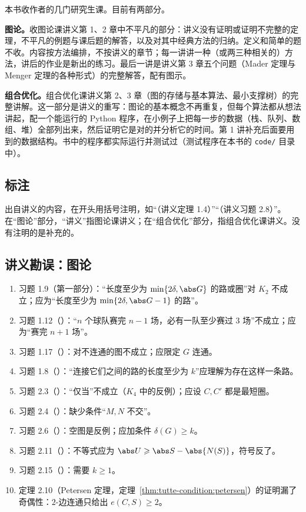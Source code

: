 
本书收作者的几门研究生课。目前有两部分。

\textbf{图论。}收图论课讲义第 1、2 章中不平凡的部分：讲义没有证明或证明不完整的定理，不平凡的例题与课后题的解答，以及对其中经典方法的归纳。定义和简单的题不收。内容按方法编排，不按讲义的章节；每一讲讲一种（或两三种相关的）方法，讲后的作业是新出的练习。最后一讲是讲义第 3 章五个问题（Mader 定理与 Menger 定理的各种形式）的完整解答，配有图示。

\textbf{组合优化。}组合优化课讲义第 2、3 章（图的存储与基本算法、最小支撑树）的完整讲解。这一部分是讲义的重写：图论的基本概念不再重复，但每个算法都从想法讲起，配一个能运行的 Python 程序，在小例子上把每一步的数据（栈、队列、数组、堆）全部列出来，然后证明它是对的并分析它的时间。第 1 讲补充后面要用到的数据结构。书中的程序都实际运行并测试过（测试程序在本书的 \texttt{code/} 目录中）。

\subsection*{标注}

出自讲义的内容，在开头用括号注明，如“（讲义定理 1.4）”“（讲义习题 2.8）”。在“图论”部分，“讲义”指图论课讲义；在“组合优化”部分，指组合优化课讲义。没有注明的是补充的。

\subsection*{讲义勘误：图论}

\begin{enumerate}
\item 习题 1.9（第一部分）：“长度至少为 $\min\{2\delta,\abs G\}$ 的路或圈”对 $K_2$ 不成立；应为“长度至少为 $\min\{2\delta,\abs G-1\}$ 的路”。
\item 习题 1.12（）：“$n$ 个球队赛完 $n-1$ 场，必有一队至少赛过 $3$ 场”不成立；应为“赛完 $n+1$ 场”。
\item 习题 1.17（）：对不连通的图不成立；应限定 $G$ 连通。
\item 习题 1.8（）：“连接它们之间的路的长度至少为 $k$”应理解为存在这样一条路。
\item 习题 2.3（）：“仅当”不成立（$K_4$ 中的反例）；应设 $C,C'$ 都是最短圈。
\item 习题 2.4（）：缺少条件“$M,N$ 不交”。
\item 习题 2.6（）：空图是反例；应加条件 $\delta(G)\geqslant k$。
\item 习题 2.11（）：不等式应为 $\abs U\geqslant\abs S-\abs{N(S)}$，符号反了。
\item 习题 2.15（）：需要 $k\geqslant1$。
\item 定理 2.10（Petersen 定理，定理~\ref{thm:tutte-condition:petersen}）的证明漏了奇偶性：$2$-边连通只给出 $e(C,S)\geqslant2$。
\end{enumerate}

